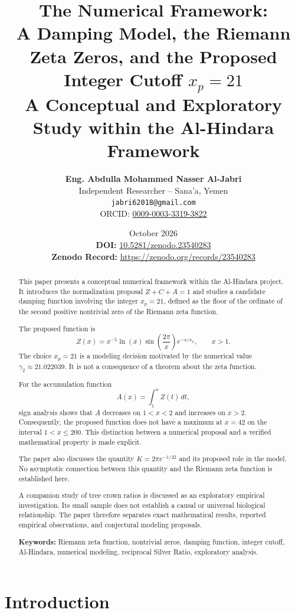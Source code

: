\documentclass[11pt,a4paper]{article}
\title{
\textbf{The Numerical Framework:}\\
\Large A Damping Model, the Riemann Zeta Zeros,
and the Proposed Integer Cutoff \(x_p=21\)\\[0.5em]
\large A Conceptual and Exploratory Study within
the Al-Hindara Framework
}
\author{
\textbf{Eng. Abdulla Mohammed Nasser Al-Jabri}\\
\small Independent Researcher -- Sana'a, Yemen\\
\small\texttt{jabri62018@gmail.com}\\
\small ORCID:
\href{https://orcid.org/0009-0003-3319-3822}
{0009-0003-3319-3822}
}
\date{
October 2026 \\[1em]
\small \textbf{DOI:} \href{https://doi.org/10.5281/zenodo.23540283}{10.5281/zenodo.23540283} \\
\small \textbf{Zenodo Record:} \url{https://zenodo.org/records/23540283}
}
\begin{document}
\maketitle
\thispagestyle{fancy}

\begin{abstract}
\noindent
This paper presents a conceptual numerical framework within
the Al-Hindara project. It introduces the normalization proposal
\(Z+C+A=1\) and studies a candidate damping function involving
the integer \(x_p=21\), defined as the floor of the ordinate of
the second positive nontrivial zero of the Riemann zeta function.

The proposed function is
\[
Z(x)=x^{-5}\ln(x)\sin\left(\frac{2\pi}{x}\right)e^{-x/x_p},
\qquad x>1.
\]
The choice \(x_p=21\) is a modeling decision motivated by the
numerical value \(\gamma_2\approx21.022039\). It is not a
consequence of a theorem about the zeta function.

For the accumulation function
\[
A(x)=\int_1^x Z(t)\,dt,
\]
sign analysis shows that \(A\) decreases on \(1<x<2\) and
increases on \(x>2\). Consequently, the proposed function does
not have a maximum at \(x=42\) on the interval \(1<x\leq200\).
This distinction between a numerical proposal and a verified
mathematical property is made explicit.

The paper also discusses the quantity
\(K=2\pi e^{-1/42}\) and its proposed role in the model.
No asymptotic connection between this quantity and the
Riemann zeta function is established here.

A companion study of tree crown ratios is discussed as an
exploratory empirical investigation. Its small sample does not
establish a causal or universal biological relationship.
The paper therefore separates exact mathematical results,
reported empirical observations, and conjectural modeling
proposals.
\vspace{1em}

\noindent\textbf{Keywords:}
Riemann zeta function, nontrivial zeros, damping function,
integer cutoff, Al-Hindara, numerical modeling,
reciprocal Silver Ratio, exploratory analysis.
\end{abstract}

\section{Introduction}
\end{document}
